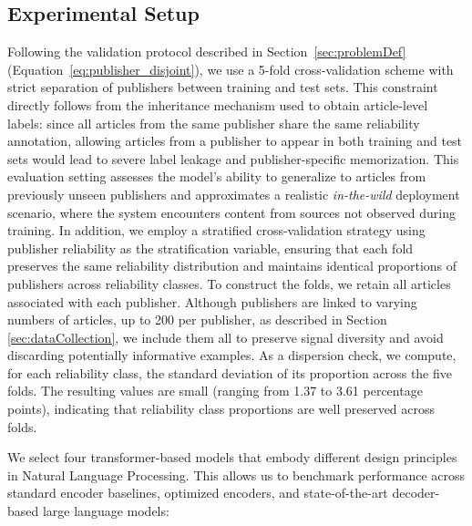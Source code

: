 \documentclass[journal]{IEEEtran}
\begin{document}
\subsection{Experimental Setup}
\label{sec:experimental_setup}

Following the validation protocol described in Section~\ref{sec:problemDef} (Equation~\ref{eq:publisher_disjoint}), we use a 5-fold cross-validation scheme with strict separation of publishers between training and test sets. This constraint directly follows from the inheritance mechanism used to obtain article-level labels: since all articles from the same publisher share the same reliability annotation, allowing articles from a publisher to appear in both training and test sets would lead to severe label leakage and publisher-specific memorization.
This evaluation setting assesses the model’s ability to generalize to articles from previously unseen publishers and approximates a realistic \textit{in-the-wild} deployment scenario, where the system encounters content
from sources not observed during training.
In addition, we employ a stratified cross-validation strategy using publisher reliability as the stratification variable, ensuring that each fold preserves the same reliability distribution and maintains identical proportions of publishers across reliability classes. To construct the folds, we retain all articles associated with each publisher. Although publishers are linked to varying numbers of articles, up to 200 per publisher, as described in Section \ref{sec:dataCollection}, we include them all to preserve signal diversity and avoid discarding potentially informative examples.
As a dispersion check, we compute, for each reliability class, the standard deviation of its proportion across the five folds. The resulting values are small (ranging from 1.37 to 3.61 percentage points), indicating that reliability class proportions are well preserved across folds.

We select four transformer-based models that embody different design principles in Natural Language Processing. This allows us to benchmark performance across standard encoder baselines, optimized encoders, and state-of-the-art decoder-based large language models:
\end{document}
